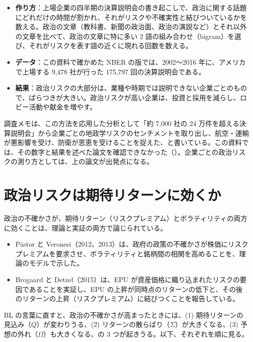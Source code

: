 \begin{paperbox}
\begin{itemize}
\item \textbf{作り方}：上場企業の四半期の決算説明会の書き起こしで、政治に関する話題にどれだけの時間が割かれ、それがリスクや不確実性と結びついているかを数える。政治の文章（教科書、新聞の政治面、政治の演説など）とそれ以外の文章を比べて、政治の文章に特に多い 2 語の組み合わせ（bigram）を選び、それがリスクを表す語の近くに現れる回数を数える。
\item \textbf{データ}：この資料で確かめた NBER の版では、2002〜2016 年に、アメリカで上場する 9,478 社が行った 175,797 回の決算説明会である。
\item \textbf{結果}：政治リスクの大部分は、業種や時期では説明できない企業ごとのもので、ばらつきが大きい。政治リスクが高い企業は、投資と採用を減らし、ロビー活動や献金を増やす。
\end{itemize}
\end{paperbox}

調査メモは、この方法を応用した分析として「約 7,000 社の 24 万件を超える決算説明会」から企業ごとの地政学リスクのセンチメントを取り出し、航空・運輸が悪影響を受け、防衛が恩恵を受けることを捉えた、と書いている。この資料では、その数字と結果を述べた論文を確認できなかった（）。企業ごとの政治リスクの測り方としては、上の論文が出発点になる。

\section{政治リスクは期待リターンに効くか}

政治の不確かさが、期待リターン（リスクプレミアム）とボラティリティの両方に効くことは、理論と実証の両方で論じられている。

\begin{itemize}
\item Pástor と Veronesi（2012、2013）は、政府の政策の不確かさが株価にリスクプレミアムを要求させ、ボラティリティと銘柄間の相関を高めることを、理論のモデルで示した。
\item Brogaard と Detzel（2015）は、EPU が資産価格に織り込まれたリスクの要因であることを実証し、EPU の上昇が同時点のリターンの低下と、その後のリターンの上昇（リスクプレミアム）に結びつくことを報告している。
\end{itemize}

BL の言葉に直すと、政治の不確かさが高まったときには、(1) 期待リターンの見込み（$Q$）が変わりうる、(2) リターンの散らばり（$\Sigma$）が大きくなる、(3) 予想の外れ（$\Omega$）も大きくなる、の 3 つが起きうる。以下、それぞれを順に見る。

